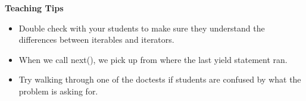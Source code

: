 \begin{guide}
    \textbf{Teaching Tips}
    \begin{itemize}
       \item Double check with your students to make sure they understand the differences between iterables and iterators.
       \item When we call next(), we pick up from where the last yield statement ran.
       \item Try walking through one of the doctests if students are confused by what the problem is asking for.
    \end{itemize}
 \end{guide}
